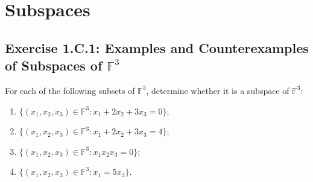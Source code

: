 \chapter{Subspaces}
\section{Exercise 1.C.1: Examples and Counterexamples of Subspaces of $\mathbb{F}^3$}
For each of the following subsets of $\mathbb{F}^3$, determine whether it is a subspace of $\mathbb{F}^3$:
\begin{enumerate}[label=(\alph*)]
\item $\{(x_1,x_2,x_3)\in\mathbb{F}^3: x_1+2x_2+3x_3=0\}$;
\item $\{(x_1,x_2,x_3)\in\mathbb{F}^3: x_1+2x_2+3x_3=4\}$;
\item $\{(x_1,x_2,x_3)\in\mathbb{F}^3: x_1x_2x_3=0\}$;
\item $\{(x_1,x_2,x_3)\in\mathbb{F}^3: x_1=5x_3\}$.
\end{enumerate}
